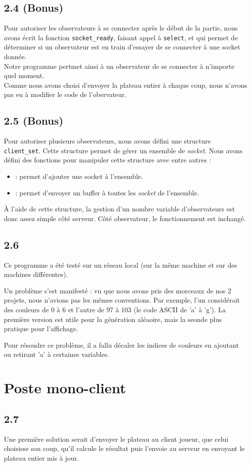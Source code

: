 \documentclass[12pt]{article}
\def\question#1{\subsection{#1}}
\def\sec#1{\section{#1}}
\begin{document}
  

\question{2.4 (Bonus)}
Pour autoriser les observateurs à se connecter après le début de la partie, nous avons écrit la fonction \texttt{socket\_ready}, faisant appel à \texttt{select}, et qui permet de déterminer si un observateur est en train d'essayer de se connecter à une socket donnée. \\
Notre programme pertmet ainsi à un observateur de se connecter à n'importe quel moment. \\
Comme nous avons choisi d'envoyer la plateau entier à chaque coup, nous n'avons pas eu à modifier le code de l'obervateur.



\question{2.5 (Bonus)}
Pour autoriser plusieurs observateurs, nous avons défini une structure \texttt{client\_set}. Cette structure permet de gérer un ensemble de \textit{socket}. Nous avons défini des fonctions pour manipuler cette structure avec entre autres :
\begin{itemize}
\item {} : permet d'ajouter une socket à l'ensemble.
\item {} : permet d'envoyer un buffer à toutes les \textit{socket} de l'ensemble.
\end{itemize}
À l'aide de cette structure, la gestion d'un nombre variable d'observateurs est donc assez simple côté serveur. Côté observateur, le fonctionnement est inchangé.



\question{2.6} %

Ce programme a été testé sur un réseau local (sur la même machine et sur des machines différentes).

Un problème s'est manifesté : vu que nous avons pris des morceaux de nos 2 projets, nous n'avions pas les mêmes conventions. Par exemple, l'un considérait des couleurs de 0 à 6 et l'autre de 97 à 103 (le code ASCII de 'a' à 'g'). La première version est utile pour la génération aléaoire, mais la seonde plus pratique pour l'affichage.

Pour résoudre ce problème, il a fallu décaler les indices de couleurs en ajoutant ou retirant 'a' à certaines variables.


\sec{Poste mono-client}
\question{2.7}
Une première solution serait d'envoyer le plateau au client joueur, que celui choisisse son coup, qu'il calcule le résultat puis l'envoie au serveur en envoyant le plateau entier mis à jour.
\end{document}
